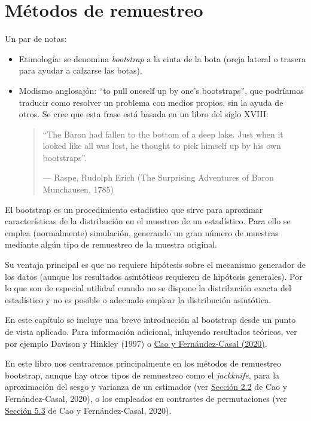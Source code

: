 \documentclass[
  10pt,
]{book}
\theoremstyle{break}
\theoremstyle{nonumberplain}
\begin{document}
\hypertarget{bootstrap}{%
\chapter{Métodos de remuestreo}\label{bootstrap}}

Un par de notas:

\begin{itemize}
\item
  Etimología: se denomina \emph{bootstrap} a la cinta de la bota (oreja lateral o trasera para ayudar a calzarse las botas).
\item
  Modismo anglosajón: ``to pull oneself up by one's bootstraps'', que podríamos traducir como resolver un problema con medios propios, sin la ayuda de otros.
  Se cree que esta frase está basada en un libro del siglo XVIII:

  \begin{quote}
  ``The Baron had fallen to the bottom of a deep lake.
  Just when it looked like all was lost,
  he thought to pick himself up by his own bootstraps''.

  --- Raspe, Rudolph Erich (The Surprising Adventures of Baron Munchausen, 1785)
  \end{quote}
\end{itemize}

El bootstrap es un procedimiento estadístico que sirve para aproximar características de la distribución en el muestreo de un estadístico.
Para ello se emplea (normalmente) simulación, generando un gran número de muestras mediante algún tipo de remuestreo de la muestra original.

Su ventaja principal es que no requiere hipótesis sobre el mecanismo generador de los datos (aunque los resultados asintóticos requieren de hipótesis generales).
Por lo que son de especial utilidad cuando no se dispone la distribución exacta del estadístico y no es
posible o adecuado emplear la distribución asintótica.

En este capítulo se incluye una breve introducción al bootstrap desde un punto de vista aplicado.
Para información adicional, inluyendo resultados teóricos, ver por ejemplo Davison y Hinkley (1997) o \href{https://rubenfcasal.github.io/book_remuestreo}{Cao y Fernández-Casal (2020)}.

En este libro nos centraremos principalmente en los métodos de remuestreo bootstrap, aunque hay otros tipos de remuestreo como el \emph{jackknife}, para la aproximación del sesgo y varianza de un estimador (ver \href{https://rubenfcasal.github.io/book_remuestreo/jackknife.html}{Sección 2.2} de Cao y Fernández-Casal, 2020), o los empleados en contrastes de permutaciones (ver \href{https://rubenfcasal.github.io/book_remuestreo/contrastes-de-permutaciones.html}{Sección 5.3} de Cao y Fernández-Casal, 2020).
\end{document}
